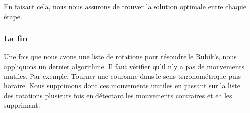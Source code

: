 En faisant cela, nous nous assurons de trouver la solution optimale entre chaque étape.

\subsubsection{La fin}
Une fois que nous avons une liste de rotations pour résoudre le Rubik's, nous appliquons un dernier algorithme.
Il faut vérifier qu'il n'y a pas de mouvements inutiles.
Par exemple: Tourner une couronne dans le sens trigonométrique puis horaire.
Nous supprimons donc ces mouvements inutiles en passant sur la liste des rotations plusieurs fois en détectant les mouvements contraires et en les supprimant.




